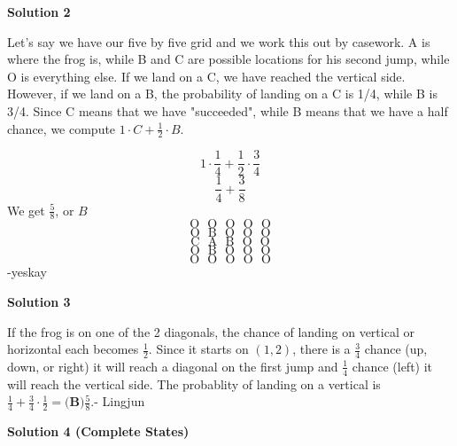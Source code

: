 \begin{enumerate}
 



\textbf{Solution 2}

Let's say we have our five by five grid and we work this out by casework. A is where the frog is, while B and C are possible locations for his second jump, while O is everything else. If we land on a C, we have reached the vertical side. However, if we land on a B, the probability of landing on a C is 1/4, while B is 3/4. Since C means that we have "succeeded", while B means that we have a half chance, we compute $1 \cdot C + \frac{1}{2} \cdot B$. 

 

 \[1 \cdot \frac{1}{4} + \frac{1}{2} \cdot \frac{3}{4}\]
 \[\frac{1}{4} + \frac{3}{8}\]We get $\frac{5}{8}$, or $B$
 \[\text{O}\ \ \ \text{O}\ \ \ \text{O}\ \ \ \text{O}\ \ \ \text{O}\] 
 \[\text{O}\ \ \ \text{B}\ \ \ \text{O}\ \ \ \text{O}\ \ \ \text{O}\]
 \[\text{C}\ \ \ \text{A}\ \ \ \text{B}\ \ \ \text{O}\ \ \ \text{O}\]
 \[\text{O}\ \ \ \text{B}\ \ \ \text{O}\ \ \ \text{O}\ \ \ \text{O}\]
 \[\text{O}\ \ \ \text{O}\ \ \ \text{O}\ \ \ \text{O}\ \ \ \text{O}\]-yeskay

 



\textbf{Solution 3}

If the frog is on one of the 2 diagonals, the chance of landing on vertical or horizontal each becomes $\frac{1}{2}$. Since it starts on $(1,2)$, there is a $\frac{3}{4}$ chance (up, down, or right) it will reach a diagonal on the first jump and $\frac{1}{4}$ chance (left) it will reach the vertical side. The probablity of landing on a vertical is $\frac{1}{4}+\frac{3}{4} \cdot \frac{1}{2}=\boxed{\textbf{(B)} \frac{5}{8}}$.- Lingjun

 



\textbf{Solution 4 (Complete States)}


\end{enumerate}
